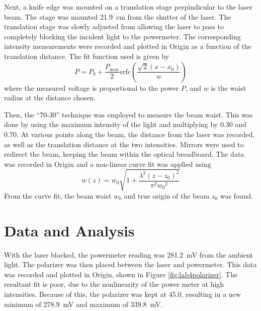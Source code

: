 \documentclass[notitlepage]{report}
\begin{document}
	Next, a knife edge was mounted on a translation stage perpindicular to the laser beam. The stage was mounted \SI{21.9}{\centi\meter} from the shutter of the laser. The translation stage was slowly adjusted from allowing the laser to pass to completely blocking the incident light to the powermeter. The corresponding intensity measurements were recorded and plotted in Origin as a function of the translation distance. The fit function used is given by \begin{equation}
		P  = P_0 + \frac{ P_\mathrm{max} }{2} \mathrm{erfc}\left(\frac{\sqrt{2}(x-x_0)}{w}\right) \label{eq:erf}
	\end{equation}
	where the measured voltage is proportional to the power $P$, and $w$ is the waist radius at the distance chosen.
	
	Then, the ``70-30'' technique was employed to measure the beam waist. This was done by using the maximum intensity of the light and multiplying by $0.30$ and $0.70$. At various points along the beam, the distance from the laser was recorded, as well as the translation distance at the two intensities. Mirrors were used to redirect the beam, keeping the beam within the optical breadboard. The data was recorded in Origin and a non-linear curve fit was applied using \begin{equation}
		w(z) = w_0 \sqrt{1 + \frac{ \lambda^2 (z-z_0)^2 }{\pi^2 {w_0}^2} } \label{eq:width}
	\end{equation}
	From the curve fit, the beam waist $w_0$ and true origin of the beam $z_0$ was found. 
	
	\section{Data and Analysis}
	With the laser blocked, the powermeter reading was \SI{281.2}{\mV} from the ambient light. The polarizer was then placed between the laser and powermeter. This data was recorded and plotted in Origin, shown in Figure \ref{fig:lab4polarizer}. The resultant fit is poor, due to the nonlinearity of the power meter at high intensities. Because of this, the polarizer was kept at \SI{45.0}{\deg}, resulting in a new minimum of \SI{278.9}{\mV} and maximum of \SI{339.8}{\mV}.
	
\end{document}

